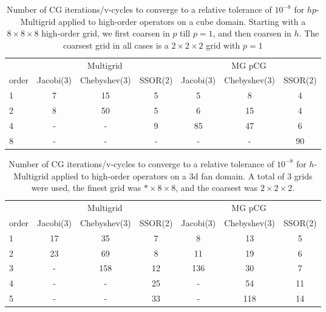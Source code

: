 \begin{table}
  \caption{\label{tab:box3p} Number of CG iterations/v-cycles to converge to a relative tolerance of $10^{-8}$ for $hp$-Multigrid applied to high-order operators on a cube domain. Starting with a $8\times 8\times 8$ high-order grid, we first coarsen in $p$ till $p=1$, and then coarsen in $h$. The coarsest grid in all cases is a $2\times 2\times 2$ grid with $p=1$}
		\centering
		\begin{tabular}{|l|c|c|c|c|c|c|} 
	    \hline
				    & \multicolumn{3}{c|}{Multigrid} & \multicolumn{3}{c|}{MG pCG}\\  \cline{2-7}
			order & \scriptsize Jacobi(3)  &\scriptsize  Chebyshev(3)  &\scriptsize SSOR(2) &\scriptsize Jacobi(3)  &\scriptsize  Chebyshev(3)  &\scriptsize SSOR(2) \\
			\hline
        1 & 7 & 15 & 5 & 5 & 8 & 4 \\
        2 & 8 & 50 & 5 & 6 & 15 & 4 \\
			  4 & - & - & 9 & 85 & 47 & 6 \\
        8 & - & - & - & -  &  - & 90 \\
      \hline
	  \end{tabular}
\end{table}

\begin{table}
  \caption{\label{tab:fan3} Number of CG iterations/v-cycles to converge to a relative tolerance of $10^{-8}$ for $h$-Multigrid applied to high-order operators on a 3d fan domain. A total of 3 grids were used, the finest grid was $*\times 8\times 8$, and the coarsest was $2\times 2\times 2$.}
		\centering
    \begin{tabular}{|l|c|c|c|c|c|c|} 
	    \hline
				    & \multicolumn{3}{c|}{Multigrid} & \multicolumn{3}{c|}{MG pCG}\\  \cline{2-7}
			order & \scriptsize Jacobi(3)  &\scriptsize  Chebyshev(3)  &\scriptsize SSOR(2) &\scriptsize Jacobi(3)  &\scriptsize  Chebyshev(3)  &\scriptsize SSOR(2) \\
			\hline
        1 & 17 & 35 & 7 & 8 & 13 & 5 \\
        2 & 23 & 69 & 8 & 11 & 19 & 6 \\  
        3 & -  & 158 & 12 & 136 & 30 & 7 \\
        4 & - & - & 25 & - & 54 & 11 \\
        5 & - & - & 33 & - & 118 & 14 \\ 
			\hline
	  \end{tabular}
\end{table}

